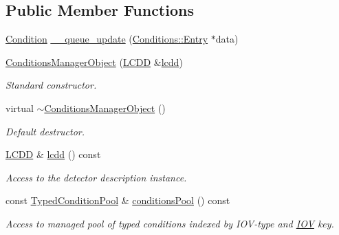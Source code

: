 \subsection*{Public Member Functions}
\begin{DoxyCompactItemize}
\item 
\hyperlink{class_d_d4hep_1_1_conditions_1_1_condition}{Condition} \hyperlink{class_d_d4hep_1_1_conditions_1_1_conditions_manager_object_ad22280768d433c68fabe8709a1bb6fda}{\+\_\+\+\_\+queue\+\_\+update} (\hyperlink{class_d_d4hep_1_1_conditions_1_1_entry}{Conditions\+::\+Entry} $\ast$data)
\item 
\hyperlink{class_d_d4hep_1_1_conditions_1_1_conditions_manager_object_adff4e6fe39f5057945ff8ac0634aad2e}{Conditions\+Manager\+Object} (\hyperlink{class_d_d4hep_1_1_geometry_1_1_l_c_d_d}{L\+C\+DD} \&\hyperlink{class_d_d4hep_1_1_conditions_1_1_conditions_manager_object_a658c9e7b77829462a839c6cbbf383c4e}{lcdd})
\begin{DoxyCompactList}\small\item\em Standard constructor. \end{DoxyCompactList}\item 
virtual \hyperlink{class_d_d4hep_1_1_conditions_1_1_conditions_manager_object_a78747f9367ce2e43b3d0ee4214eb9ab3}{$\sim$\+Conditions\+Manager\+Object} ()
\begin{DoxyCompactList}\small\item\em Default destructor. \end{DoxyCompactList}\item 
\hyperlink{class_d_d4hep_1_1_geometry_1_1_l_c_d_d}{L\+C\+DD} \& \hyperlink{class_d_d4hep_1_1_conditions_1_1_conditions_manager_object_a658c9e7b77829462a839c6cbbf383c4e}{lcdd} () const
\begin{DoxyCompactList}\small\item\em Access to the detector description instance. \end{DoxyCompactList}\item 
const \hyperlink{class_d_d4hep_1_1_conditions_1_1_conditions_manager_object_a1617c134372fbb79d06990707f19bb0c}{Typed\+Condition\+Pool} \& \hyperlink{class_d_d4hep_1_1_conditions_1_1_conditions_manager_object_ac7ad54c38522f1eab91dbe077b4dd6ce}{conditions\+Pool} () const
\begin{DoxyCompactList}\small\item\em Access to managed pool of typed conditions indexed by I\+O\+V-\/type and \hyperlink{class_d_d4hep_1_1_i_o_v}{I\+OV} key. \end{DoxyCompactList}\item 

\end{DoxyCompactItemize}
